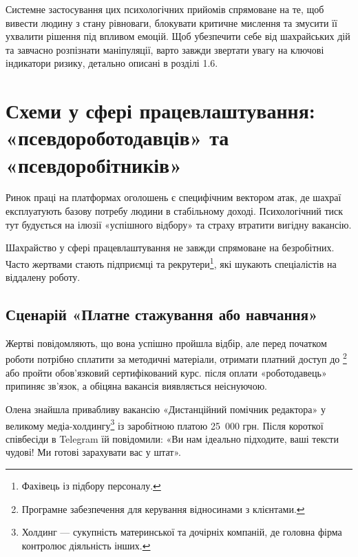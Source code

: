 \vspace{0.8em}

\noindent Системне застосування цих психологічних прийомів спрямоване на те, щоб вивести людину з стану рівноваги, блокувати критичне мислення та змусити її ухвалити рішення під впливом емоцій. Щоб убезпечити себе від шахрайських дій та завчасно розпізнати маніпуляції, варто завжди звертати увагу на ключові індикатори ризику, детально описані в розділі 1.6.

\newpage

\chapter{Схеми у сфері працевлаштування: «псевдороботодавців» та «псевдоробітників»}


Ринок праці на платформах оголошень є специфічним вектором атак, де шахраї експлуатують базову потребу людини в стабільному доході. Психологічний тиск тут будується на ілюзії «успішного відбору» та страху втратити вигідну вакансію.

Шахрайство у сфері працевлаштування не завжди спрямоване на безробітних. Часто жертвами стають підприємці та рекрутери\footnote{Фахівець із підбору персоналу.}, які шукають спеціалістів на віддалену роботу.

\vspace{0.3cm}
\section{Сценарій «Платне стажування або навчання»}

Жертві повідомляють, що вона успішно пройшла відбір, але перед початком роботи потрібно сплатити за методичні матеріали, отримати платний доступ до \footnote{Програмне забезпечення для керування відносинами з клієнтами.} або пройти обов'язковий сертифікований курс.  після оплати «роботодавець» припиняє зв'язок, а обіцяна вакансія виявляється неіснуючою.


Олена знайшла привабливу вакансію «Дистанційний помічник редактора» у великому медіа-холдингу\footnote{Холдинг — сукупність материнської та дочірніх компаній, де головна фірма контролює діяльність інших.} із заробітною платою 25~000 грн. Після короткої співбесіди в Telegram їй повідомили: «Ви нам ідеально підходите, ваші тексти чудові! Ми готові зарахувати вас у штат». 

